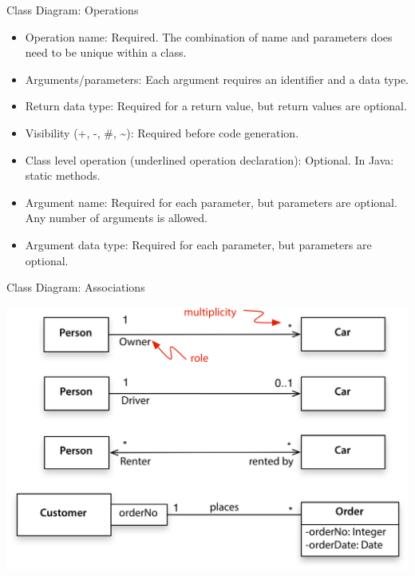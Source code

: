 \begin{frame}{Class Diagram: Operations}
    \begin{itemize}
	\item Operation name: Required. The combination of name and parameters does need to be unique within a class.
	\item Arguments/parameters: Each argument requires an identifier and a data type. 
	\item Return data type: Required for a return value, but return values are optional. 
	\item Visibility (+, -, \#, \textasciitilde): Required before code generation. 
	\item Class level operation (underlined operation declaration): Optional. In Java: static methods.
	\item Argument name: Required for each parameter, but parameters are optional. Any number of arguments is allowed.
	\item Argument data type: Required for each parameter, but parameters are optional.
   \end{itemize}
\end{frame}

\begin{frame}{Class Diagram: Associations}
\begin{center}
  \includegraphics[scale=0.6]{associations.png}
\end{center}
  
\end{frame}

